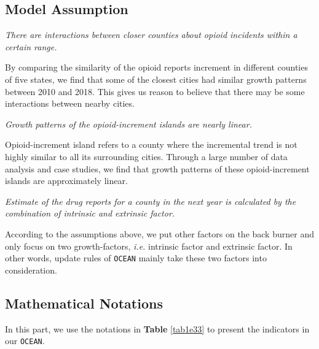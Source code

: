 \documentclass[a4paper]{article}
\begin{document}

\subsection{Model Assumption}

\vspace{4pt}
\begin{assumption}
  \textit{There are interactions between closer counties about opioid incidents within a certain range.}
\end{assumption}
By comparing the similarity of the opioid reports increment in different counties of five states, we find that some of the closest cities had similar growth patterns between 2010 and 2018. This gives us reason to believe that there may be some interactions between nearby cities.

\vspace{8pt}
\begin{assumption}
  \textit{Growth patterns of the opioid-increment islands are nearly linear.}
\end{assumption}
Opioid-increment island refers to a county where the incremental trend is not highly similar to all its surrounding cities. Through a large number of data analysis and case studies, we find that growth patterns of these opioid-increment islands are approximately linear.

\vspace{8pt}
\begin{assumption}
  \textit{Estimate of the drug reports for a county in the next year is calculated by the combination of intrinsic and extrinsic factor.}
\end{assumption}
According to the assumptions above, we put other factors on the back burner and only focus on two growth-factors, \textit{i.e.} intrinsic factor and extrinsic factor. In other words, update rules of \texttt{OCEAN} mainly take these two factors into consideration.


\subsection{Mathematical Notations}

In this part, we use the notations in \textbf{Table} \ref{tab1e33} to present the indicators in our \texttt{OCEAN}. 
\end{document}
